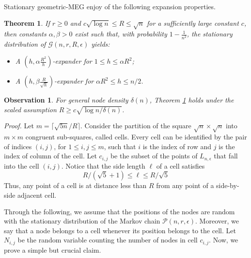 \documentclass[10pt,a4paper]{article}
\newtheorem{theorem}[definition]{Theorem}
\newtheorem{obs}[definition]{Observation}
\newcommand{\proof}{\noindent\textit{Proof. }}
\begin{document}
\noindent Stationary geometric-MEG enjoy of the following expansion properties.

\begin{theorem}\label{thm:geomexpan}
If  $r\geqslant 0$ and  $c\sqrt{\log n} \leqslant R \leqslant \sqrt{n}$ for a sufficiently large constant $c$, then constants $\alpha, \beta > 0$ exist such that, with probability $1 - \frac{1}{n^2}$, the stationary distribution of $\mathcal{G}(n, r, R, \epsilon)$ yields:
\begin{itemize}
\item A $(h, \alpha\frac{R^2}{h})$-expander for $1 \leqslant h \leqslant \alpha R^2$;
\item A $(h, \beta\frac{R}{\sqrt{h}})$-expander for $\alpha R^2 \leqslant h \leqslant n/2$.
\end{itemize}
\end{theorem}

\begin{obs}\label{obs::delta}
For general node density $\delta(n)$, Theorem \ref{thm:geomexpan} holds under the scaled assumption $R \geqslant c \sqrt{\log n / \delta(n)}$.
\end{obs}
\proof
Let $m = \lceil\sqrt{5n}/R\rceil$. Consider the partition of the square $\sqrt{n}\times\sqrt{n}$ into $m\times m$ congruent sub-squares, called cells. Every cell can be identified by the pair of indices $(i, j)$, for $1\leqslant i, j\leqslant m$, such that $i$ is the index of row and $j$ is the index of column of the cell. Let $c_{i,j}$ be the subset of the points of $L_{n,\epsilon}$ that fall into the cell $(i, j)$. Notice that the side length $\ell$ of a cell satisfies
\[
R/(\sqrt{5} + 1) \leqslant \ell\leqslant R/\sqrt{5}
\]
Thus, any point of a cell is at distance less than $R$ from any point of a side-by-side adjacent cell.

\noindent Through the following, we assume that the positions of the nodes are random with the stationary distribution of the Markov chain $\mathcal{P}(n, r, \epsilon)$. Moreover, we say that a node belongs to a cell whenever its position belongs to the cell. \noindent Let $N_{i,j}$ be the random variable counting the number of nodes in cell $c_{i,j}$. Now, we prove a simple but crucial claim.
\end{document}
